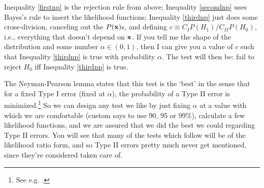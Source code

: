 Inequality \ref{firstnp} is the rejection rule from above; Inequality
\ref{secondnp} uses Bayes's rule to insert the likelihood functions;
Inequality \ref{thirdnp} just does some cross-division, canceling out the
$P({\bf x})$s, and defining $c\equiv C_IP(H_1)/C_{II}P(H_0)$, i.e., everything
that doesn't depend on ${\bf x}$. If you tell me the shape of the distribution
and some number $\alpha\in(0,1)$, then I can give you a value of $c$
such that Inequality \ref{thirdnp} is true with probability
$\alpha$. The test will then be: fail to reject $H_0$ iff Inequality
\ref{thirdnp} is true.

The Neyman-Pearson lemma states
that this test is the `best' in the sense that for a
fixed Type I error (fixed at $\alpha$), the probability of a Type II
error is minimized.\footnote{See e.g. \citet[189--191]{amemiya:ez}.} So we can design any test we like by just fixing $\alpha$
at a value with which we are comfortable (custom says to use
90, 95 or 99\%), calculate a few likelihood functions, and we are assured
that we did the best we could regarding Type II errors. You will see that
many of the tests which follow will be of the likelihood ratio form,
and so Type II errors pretty much never get mentioned, since they're
considered taken care of.


